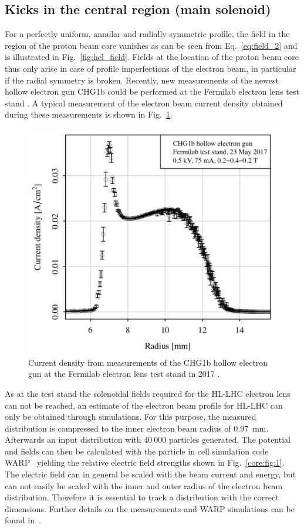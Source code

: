 \documentclass[%
 reprint,
 amsmath,amssymb,
 aps,
prstab,
]{revtex4-1}
\begin{document}
\subsection{Kicks in the central region (main solenoid)}
\label{core:sec:2}
For a perfectly uniform, annular and radially symmetric profile, the field in the region of the proton beam core vanishes as can be seen from Eq.~\ref{eq:field_2} and is illustrated in Fig.~\ref{fig:hel_field}. Fields at the location of the proton beam core thus only arise in case of profile imperfections of the electron beam, in particular if the radial symmetry is broken. Recently, new measurements of the newest hollow electron gun CHG1b could be performed at the Fermilab electron lens test stand \cite{hel_test_stand_fnal}. A typical measurement of the electron beam current density obtained during these measurements is shown in Fig.~\ref{core:fig:0}.
\begin{figure}[t]
		\centering
		\includegraphics[width=0.8\linewidth]{e-field-measured.png}
	\caption{Current density from measurements of the CHG1b hollow electron gun at the Fermilab electron lens test stand in 2017 \cite{hel_res_field_stancari_2017}.}
	\label{core:fig:0}
\end{figure}
As at the test stand the solenoidal fields required for the HL-LHC electron lens can not be reached, an estimate of the electron beam profile for HL-LHC can only be obtained through simulations. For this purpose, the measured distribution is compressed to the inner electron beam radius of $0.97$~mm. Afterwards an input distribution with $40\ 000$ particles generated. The potential and fields can then be calculated with the particle in cell simulation code WARP~\cite{warp} yielding the relative electric field strengths shown in Fig.~\ref{core:fig:1}. The electric field can in general be scaled with the beam current and energy, but can not easily be scaled with the inner and outer radius of the electron beam distribution. Therefore it is essential to track a distribution with the correct dimensions. Further details on the measurements and WARP simulations can be found in~\cite{hel_res_field_stancari_2017}.
\end{document}
